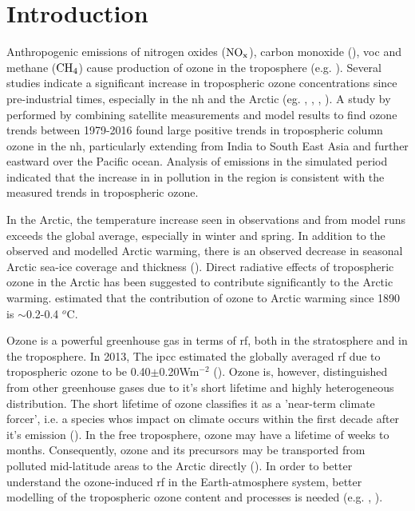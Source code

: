 \chapter{Introduction} \label{ch:introduction}
Anthropogenic emissions of nitrogen oxides ($\mathrm{NO_x}$), carbon monoxide (), \acrfull{voc} and methane ($\mathrm{CH_4}$) cause production of ozone in the troposphere (e.g. \cite{SeinfeldSpyros}). Several studies indicate a significant increase in tropospheric ozone concentrations since pre-industrial times, especially in the \acrfull{nh} and the Arctic (eg. \cite{WangJacob1998}, \cite{Shindell2007}, \cite{Parrish2014}, \cite{AMAP2015}). A study by \cite{ZIEMKE2019} performed by combining satellite measurements and model results to find ozone trends between 1979-2016 found large positive trends in tropospheric column ozone in the \acrshort{nh}, particularly extending from India to South East Asia and further eastward over the Pacific ocean. Analysis of  emissions in the simulated period indicated that the increase in in pollution in the region is consistent with the measured trends in tropospheric ozone.  

\medskip

In the Arctic, the temperature increase seen in observations and from model runs exceeds the global average, especially in winter and spring. In addition to the observed and modelled Arctic warming, there is an observed decrease in seasonal Arctic sea-ice coverage and thickness (\cite{Brock2011}). Direct radiative effects of tropospheric ozone in the Arctic has been suggested to contribute significantly to the Arctic warming. \cite{Shindell2009} estimated that the contribution of ozone to Arctic warming since 1890 is $\sim$0.2-0.4 $^o$C.

\medskip

Ozone is a powerful greenhouse gas in terms of \acrfull{rf}, both in the stratosphere and in the troposphere. In 2013, The \acrfull{ipcc} estimated the globally averaged \acrshort{rf} due to tropospheric ozone to be 0.40$\pm$0.20Wm$^{-2}$ (\cite{IPCCchapter8}). Ozone is, however, distinguished from other greenhouse gases due to it's short lifetime and highly heterogeneous distribution. The short lifetime of ozone classifies it as a 'near-term climate forcer', i.e. a species whos impact on climate occurs within the first decade after it's emission (\cite{IPCCchapter8}). In the free troposphere, ozone may have a lifetime of weeks to months. Consequently, ozone and its precursors may be transported from polluted mid-latitude areas to the Arctic directly (\cite{AMAP2015}). In order to better understand the ozone-induced \acrshort{rf} in the Earth-atmosphere system, better modelling of the tropospheric ozone content and processes is needed (e.g. \cite{Bowman2013}, \cite{Parella}). 

